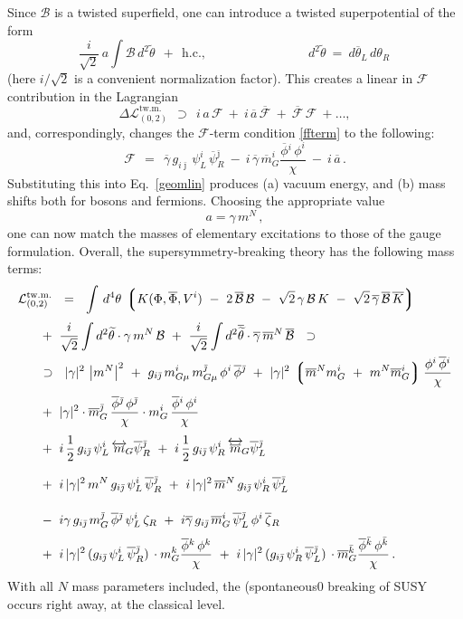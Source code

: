 \documentclass[12pt]{article}
\newcommand{\wt}{\widetilde}
\newcommand{\ov}{\overline}
\newcommand{\mc}[1]{\mathcal{#1}}
\newcommand{\lgr}{\left\lgroup}
\newcommand{\rgr}{\right\rgroup}
\newcommand{\bzr}{\ov{\zeta}{}_R}
\newcommand{\zr}{\zeta_R}
\newcommand{\bgamma}{\ov{\gamma}}
\newcommand{\bpsi}{\ov{\psi}{}}
\newcommand{\bphi}{\ov{\phi}{}}
\newcommand{\ff}{\mc{F}}
\newcommand{\bff}{\ov{\mc{F}}}
\newcommand{\bj}{{\bar \jmath}}
\newcommand{\bk}{{\bar k}}
\begin{document}
	Since $ \mc{B} $ is a twisted superfield, one can introduce a twisted superpotential of the form
\[
	\frac{i}{\sqrt{2}}\,a \int \mc{B}\, d^2\wt{\theta} ~~+~~ \text{h.c.},
	\qquad\qquad\qquad\qquad d^2\wt{\theta} ~=~ d\ov{\theta}{}_L\,d\theta_R\,
\]
	(here $ i/\sqrt{2} $ is a convenient normalization factor).
	This creates a linear in $ \ff $ contribution in the Lagrangian
\[
	\Delta\mc{L}_{(0,2)}^\text{tw.m.} ~~\supset~~ i\,a\,\ff ~+~ i\,\ov{a}\,\bff ~+~ \bff\,\ff ~+ \dots,
\]
	and, correspondingly, changes the $ \ff $-term condition \eqref{ffterm} to the following:
\[
	\ff ~~=~~ \bgamma\, g_{i\bj}\, \psi_L^i\, \bpsi_R^\bj 
		~-~ i\, \bgamma\, \ov{m}_G^i \frac{\bphi^i\, \phi^i}{\chi}
		~-~ i\, \ov{a}\,.
\]
	Substituting this into Eq.~\eqref{geomlin} produces (a) vacuum energy, and (b) mass shifts both for
	bosons and fermions.
	Choosing the appropriate value $$ a = \gamma\,m^N \,,$$ one can now match the masses
	of elementary excitations  to those of the
	gauge formulation.
	Overall, the supersymmetry-breaking theory has the following mass terms:
\begin{align}
%
\notag
	\mc{L}_{(0,2)}^\text{tw.m.} & 
	~~=~~ \int\, d^4\theta\, \lgr K(\Phi,\ov{\Phi}, V^i) 
		~-~ 2\, \ov{\mc{B}}\,\mc{B}  
		~-~  \sqrt{2}\, \gamma\,\mc{B}\,K  ~-~ \sqrt{2}\, \ov{\gamma}\,\ov{\mc{B}}\,\ov{K} \rgr
	\\[1mm]
%
\notag
	&\!\!\!\!\!\!\!\!
	~+~ \frac{i}{\sqrt{2}} \int d^2\wt{\theta} \cdot \gamma\,m^N\,\mc{B} 
	~+~ \frac{i}{\sqrt{2}} \int d^2\ov{\wt{\theta}} \cdot \bgamma\, \ov{m}{}^N\, \ov{\mc{B}}
	~~\supset~~
	\\
%
\notag
	&\!\!\!\!\!\!\!\!
	~\supset~~
	|\gamma|^2\, \left|m^N\right|^2 
	~+~ g_{i\bj}\, m_{G\mu}^i\, m_{G\mu}^\bj\, \phi^i\, \bphi^\bj
	~+~ |\gamma|^2\, \lgr \ov{m}{}^N m_G^i ~+~ m^N \ov{m}{}_G^i \rgr \frac {\phi^i\,\bphi^i}{\chi}
	\\[1mm]
%
\label{geom_mass}
	&\!\!\!\!\!\!\!\!
	~+~ |\gamma|^2 \cdot \ov{m}{}_G^\bj\,\frac{\bphi^\bj\,\phi^\bj}{\chi}
			\cdot m_G^i\, \frac{\bphi^i\, \phi^i}{\chi}
	\\[1mm]
%
\notag
	&\!\!\!\!\!\!\!\!
	~+~ i\,\frac{1}{2}\,g_{i\bj}\,\psi_L^i\, \overleftrightarrow{m}{}_{\!G} \bpsi_R^\bj
	~+~ i\,\frac{1}{2}\,g_{i\bj}\,\psi_R^i\, \overleftrightarrow{\ov{m}}{}_{\!G} \bpsi_L^\bj
	\\[3mm]
%
\notag
	&\!\!\!\!\!\!\!\!
	~+~ i\,|\gamma|^2\,m^N\,g_{i\bj}\,\psi_L^i\, \bpsi_R^\bj
	~+~ i\,|\gamma|^2\,\ov{m}{}^N\,g_{i\bj}\,\psi_R^i\, \bpsi_L^\bj
	\\[4mm]
%
\notag
	&\!\!\!\!\!\!\!\!
	~-~ i\gamma\, g_{i\bj}\, m_G^\bj\,\bphi^\bj\, \psi_L^i\,\zr
	~+~ i\bgamma\, g_{i\bj}\,\ov{m}{}_G^i\, \bpsi_L^\bj\, \phi^i\,\bzr
	\\[1mm]
%
\notag
	&\!\!\!\!\!\!\!\!
	~+~ i\, |\gamma|^2\, (g_{i\bj}\,\psi_L^i\,\bpsi_R^\bj)\, \cdot m_G^k \frac{\bphi^k\, \phi^k}{\chi}
	~+~ i\, |\gamma|^2\, (g_{i\bj}\,\psi_R^i\,\bpsi_L^\bj)\, \cdot \ov{m}{}_G^\bk \frac{\bphi^\bk\,\phi^\bk}{\chi}
	\,.
\end{align}
With all $N$ mass parameters included, the (spontaneous0 breaking of SUSY occurs right away, 
at the classical level.
\end{document}
